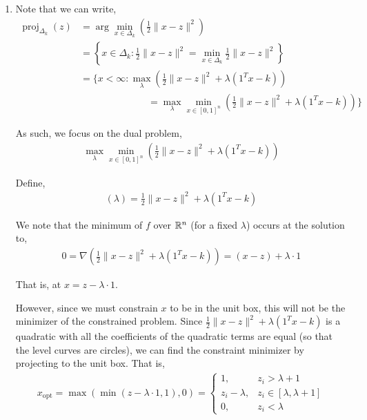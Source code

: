 \documentclass[10pt]{article}
\DeclareMathOperator*{\proj}{\operatorname{proj}}
\begin{document}
\begin{solution}[Solution]
\begin{enumerate}[label=(\alph*)]
    \item Note that we can write,
        \begin{align*}
            \proj_{\Delta_k}(z) &= \arg\min_{x\in\Delta_k} \left( \frac{1}{2} \| x-z \|^2 \right)
            \\&= \left\{ x\in \Delta_k : \frac{1}{2} \| x-z \|^2 = \min_{x\in\Delta_k} \frac{1}{2} \| x-z \|^2 \right\}
            \\&=  \bigg\{ x < \infty : \max_{\lambda} \left(\frac{1}{2} \| x-z \|^2 + \lambda(1^Tx-k) \right) 
            \\&\hspace{7em}= \max_{\lambda}\min_{x\in[0,1]^n} \left(\frac{1}{2} \| x-z \|^2 + \lambda(1^Tx-k) \right) \bigg\}
        \end{align*}
        
        As such, we focus on the dual problem,
        \begin{align*}
            \max_{\lambda} \min_{x\in[0,1]^n} \left( \frac{1}{2} \| x-z \|^2 + \lambda(1^Tx-k) \right)
        \end{align*}
        

        Define,
        \begin{align*}
            [f(x)](\lambda) = \frac{1}{2} \| x-z \|^2 + \lambda(1^Tx-k)
        \end{align*}
        
        We note that the minimum of \( f \) over \( \mathbb{R}^n \) (for a fixed \( \lambda \)) occurs at the solution to,
        \begin{align*}
            0 = \nabla \left( \frac{1}{2} \| x-z \|^2 + \lambda(1^Tx-k) \right)
            = (x-z) + \lambda \cdot 1
        \end{align*}

        That is, at \( x = z - \lambda\cdot 1 \).

        However, since we must constrain \( x \) to be in the unit box, this will not be the minimizer of the constrained problem. Since \( \frac{1}{2} \| x-z \|^2 + \lambda(1^Tx-k) \) is a quadratic with all the coefficients of the quadratic terms are equal (so that the level curves are circles), we can find the constraint minimizer by projecting to the unit box. That is,
        \begin{align*}
            x_{\text{opt}} = \max(\min(z-\lambda\cdot 1,1),0)
            = \begin{cases}
                1, & z_i> \lambda+1 \\
                z_i - \lambda, & z_i \in[\lambda,\lambda+1] \\
                0, & z_i< \lambda
            \end{cases}
        \end{align*}
        

\end{enumerate}
\end{solution}
\end{document}
